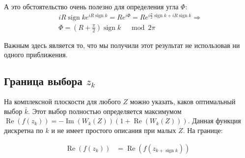 \documentclass[a4paper, 12pt]{article}
\DeclareMathOperator*{\sign}{sign}
\DeclareMathOperator*{\Real}{Re}
\DeclareMathOperator*{\Imag}{Im}
\begin{document}
А это обстоятельство очень полезно для определения угла $\Phi$:
\begin{equation}
\begin{aligned}
    &i R \sign k  e^{i R \sign k } = R e^{i\Phi} = R e^{i\frac{\pi}{2}\sign k + i R \sign k} \Rightarrow \\ 
    &\Phi = \left(R+\frac{\pi}{2}\right)\sign k \;\;\; \mod 2\pi
\end{aligned}
\end{equation}

Важным здесь является то, что мы получили этот результат не использовав ни одного приближения.
\subsection*{Граница выбора $z_k$}
На комплексной плоскости для любого $Z$ можно указать, каков оптимальный выбор $\bar{k}$. Этот выбор полностью определяется максимумом $\Real\left(f(z_k)\right) = -\Imag(W_k(Z))\left(1+\Real(W_k(Z))\right)$. 
Данная функция дискретна по $k$ и не имеет простого описания при малых $Z$. На границе:

\begin{equation}
\begin{aligned}
    \Real\left(f(z_k)\right) &= \Real\left(f(z_{k+\sign k})\right) \\
\end{aligned}
\end{equation}
\end{document}
